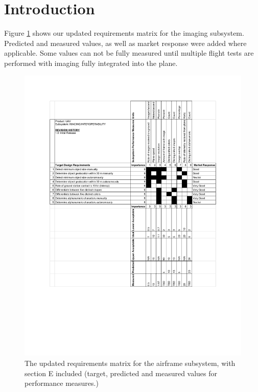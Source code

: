 \documentclass[]{auvsi_doc}
\begin{document}
\begin{AUVSITitlePage}
\begin{artifacttable}
\end{artifacttable}
\end{AUVSITitlePage}

\section{Introduction}
Figure \ref{fig:imgReq} shows our updated requirements matrix for the imaging 
subsystem. Predicted and measured values, as well as market response were added 
where applicable. Some values can not be fully measured until multiple flight tests
are performed with imaging fully integrated into the plane.

\begin{figure}[h!]
	\includegraphics[width=1.2\columnwidth]{./figs/imgReqMatrix.pdf}
	\caption{The updated requirements matrix for the airframe subsystem, with section E included (target, predicted and measured values for performance measures.)}
	\label{fig:imgReq}
\end{figure}
\end{document}

